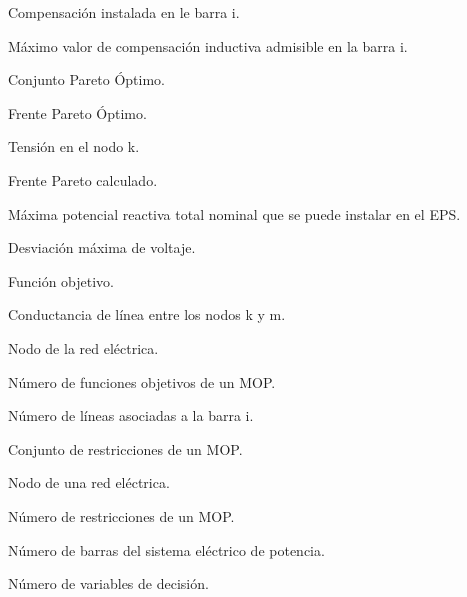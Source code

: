 \item[$B_i$] Compensaci\'on instalada en le barra i.%
\item[${b_{iI}}^m        $] M\'aximo valor de compensaci\'on inductiva admisible en la barra i.%
\item[$CPtrue        $] Conjunto Pareto Óptimo.%
\item[$Ptrue        $] Frente Pareto Óptimo.%
\item[$E_k        $] Tensi\'on en el nodo k.%
\item[$FP        $] Frente Pareto calculado.%
\item[${f_1}^m        $] M\'axima potencial reactiva total nominal que se puede instalar en el EPS.%
\item[$f_3        $] Desviaci\'on m\'axima de voltaje.%
\item[$f:\mathbb{R}^n \rightarrow \mathbb{R}        $] Funci\'on objetivo.%
\item[$G_{km}        $] Conductancia de l\'inea entre los nodos k y m.%
\item[$k        $] Nodo de la red el\'ectrica.%
\item[$\textbf{k}        $] N\'umero de funciones objetivos de un MOP.%
\item[$l_i        $] N\'umero de l\'ineas asociadas a la barra i.%
\item[$e(x)        $] Conjunto de restricciones de un MOP.%
\item[$m        $] Nodo de una red el\'ectrica.%
\item[$\textbf{m}        $] N\'umero de restricciones de un MOP.%
\item[$n        $] N\'umero de barras del sistema el\'ectrico de potencia.%
\item[$\textbf{n}        $] N\'umero de variables de decisi\'on.%
